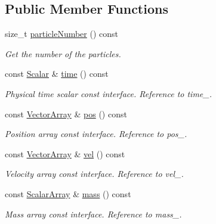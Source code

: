 \subsection*{Public Member Functions}
\begin{DoxyCompactItemize}
\item 
size\+\_\+t \mbox{\hyperlink{class_vel_indep_particles_a9fa71261c95ee53974352a31cd8ffd41}{particle\+Number}} () const
\begin{DoxyCompactList}\small\item\em Get the number of the particles. \end{DoxyCompactList}\item 
const \mbox{\hyperlink{class_vel_indep_particles_a5d275b22f0d759f360ddd80e78f4b466}{Scalar}} \& \mbox{\hyperlink{class_vel_indep_particles_a7c2968d7757eb6b3dc59259fadcf661c}{time}} () const
\begin{DoxyCompactList}\small\item\em Physical time scalar const interface. Reference to time\+\_\+. \end{DoxyCompactList}\item 
const \mbox{\hyperlink{class_vel_indep_particles_a27580f65b6523bfb6900520af2e44708}{Vector\+Array}} \& \mbox{\hyperlink{class_vel_indep_particles_a3abad5914571496cf4c956647b2bafa8}{pos}} () const
\begin{DoxyCompactList}\small\item\em Position array const interface. Reference to pos\+\_\+. \end{DoxyCompactList}\item 
const \mbox{\hyperlink{class_vel_indep_particles_a27580f65b6523bfb6900520af2e44708}{Vector\+Array}} \& \mbox{\hyperlink{class_vel_indep_particles_a5774853214c5f32f34def508962a1267}{vel}} () const
\begin{DoxyCompactList}\small\item\em Velocity array const interface. Reference to vel\+\_\+. \end{DoxyCompactList}\item 
const \mbox{\hyperlink{class_vel_indep_particles_abd6e6b0ffbbab4ebc078efd77f6a365a}{Scalar\+Array}} \& \mbox{\hyperlink{class_vel_indep_particles_ab2b7a9718d112bc2713448f9055a0833}{mass}} () const
\begin{DoxyCompactList}\small\item\em Mass array const interface. Reference to mass\+\_\+. \end{DoxyCompactList}\item 

\end{DoxyCompactItemize}
